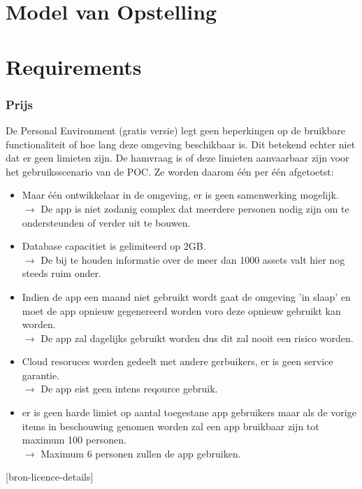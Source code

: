\section{Model van Opstelling}


\section{Requirements}

\subsubsection{Prijs}

De Personal Environment (gratis versie) legt geen beperkingen op de bruikbare functionaliteit of hoe lang deze omgeving beschikbaar is. Dit betekend echter niet dat er geen limieten zijn. De hamvraag is of deze limieten aanvaarbaar zijn voor het gebruiksscenario van de POC. Ze worden daarom één per één afgetoetst:

\begin{itemize}
    \item Maar één ontwikkelaar in de omgeving, er is geen samenwerking mogelijk.\\
    $\rightarrow$ De app is niet zodanig complex dat meerdere personen nodig zijn om te ondersteunden of verder uit te bouwen.
    \item Database capacitiet is gelimiteerd op 2GB.\\
    $\rightarrow$ De bij te houden informatie over de meer dan 1000 assets valt hier nog steeds ruim onder.
    \item Indien de app een maand niet gebruikt wordt gaat de omgeving 'in slaap' en moet de app opnieuw gegenereerd worden voro deze opnieuw gebruikt kan worden.\\
    $\rightarrow$ De app zal dagelijks gebruikt worden dus dit zal nooit een risico worden.
    \item Cloud resoruces worden gedeelt met andere gerbuikers, er is geen service garantie.\\
    $\rightarrow$ De app eist geen intens reqource gebruik. 
    \item er is geen harde limiet op aantal toegestane  app gebruikers maar als de vorige items in beschouwing genomen worden zal een app bruikbaar zijn tot maximum 100 personen.\\
    $\rightarrow$ Maximum 6 personen zullen de app gebruiken.
\end{itemize}
[bron-licence-details]


